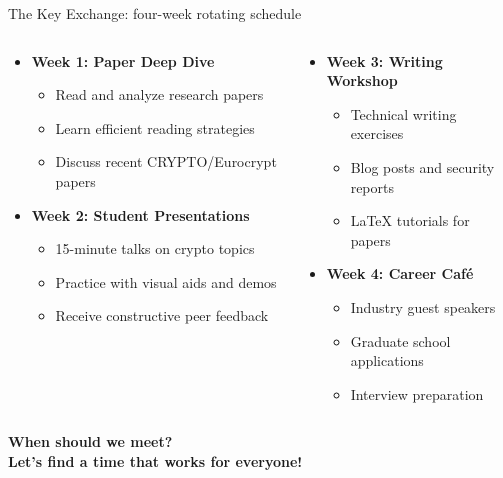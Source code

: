 \documentclass[aspectratio=169, lualatex, handout]{beamer}
\begin{document}
\begin{frame}{The Key Exchange: four-week rotating schedule}
	\begin{columns}[c]
		\begin{column}{0.5\textwidth}
			\begin{itemize}
				\item \textbf{Week 1: Paper Deep Dive}
				      \begin{itemize}
					      \item Read and analyze research papers
					      \item Learn efficient reading strategies
					      \item Discuss recent CRYPTO/Eurocrypt papers
				      \end{itemize}
				\item \textbf{Week 2: Student Presentations}
				      \begin{itemize}
					      \item 15-minute talks on crypto topics
					      \item Practice with visual aids and demos
					      \item Receive constructive peer feedback
				      \end{itemize}
			\end{itemize}
		\end{column}
		\begin{column}{0.5\textwidth}
			\begin{itemize}
				\item \textbf{Week 3: Writing Workshop}
				      \begin{itemize}
					      \item Technical writing exercises
					      \item Blog posts and security reports
					      \item LaTeX tutorials for papers
				      \end{itemize}
				\item \textbf{Week 4: Career Café}
				      \begin{itemize}
					      \item Industry guest speakers
					      \item Graduate school applications
					      \item Interview preparation
				      \end{itemize}
			\end{itemize}
		\end{column}
	\end{columns}
	\vspace{0.1cm}
	\begin{center}
		\Large\textcolor{cipherprimary}{\textbf{When should we meet? \\ Let's find a time that works for everyone!}}
	\end{center}
\end{frame}
\end{document}
